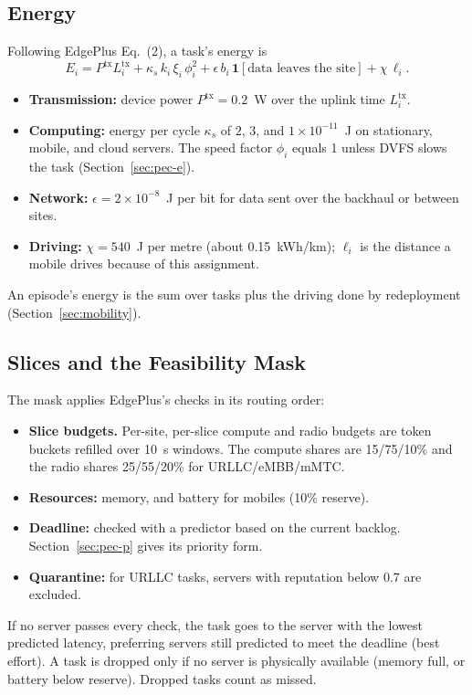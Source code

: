 \documentclass[11pt,journal,onecolumn]{IEEEtran}
\begin{document}
\subsection{Energy}
Following EdgePlus Eq.~(2), a task's energy is
\begin{equation}
E_i = P^{\mathrm{tx}} L^{\mathrm{tx}}_i + \kappa_s\, k_i\, \xi_i\, \phi_i^{2} + \epsilon\, b_i\, \mathbf{1}[\text{data leaves the site}] + \chi\, \ell_i .
\label{eq:energy}
\end{equation}
\begin{itemize}
\item \textbf{Transmission:} device power $P^{\mathrm{tx}}=0.2$~W over the uplink time $L^{\mathrm{tx}}_i$.
\item \textbf{Computing:} energy per cycle $\kappa_s$ of $2$, $3$, and $1\times10^{-11}$~J on stationary, mobile, and cloud servers. The speed factor $\phi_i$ equals 1 unless DVFS slows the task (Section~\ref{sec:pec-e}).
\item \textbf{Network:} $\epsilon = 2\times10^{-8}$~J per bit for data sent over the backhaul or between sites.
\item \textbf{Driving:} $\chi = 540$~J per metre (about 0.15~kWh/km); $\ell_i$ is the distance a mobile drives because of this assignment.
\end{itemize}
An episode's energy is the sum over tasks plus the driving done by redeployment (Section~\ref{sec:mobility}).

\subsection{Slices and the Feasibility Mask}
The mask applies EdgePlus's checks in its routing order:
\begin{itemize}
\item \textbf{Slice budgets.} Per-site, per-slice compute and radio budgets are token buckets refilled over 10~s windows. The compute shares are 15/75/10\% and the radio shares 25/55/20\% for URLLC/eMBB/mMTC.
\item \textbf{Resources:} memory, and battery for mobiles (10\% reserve).
\item \textbf{Deadline:} checked with a predictor based on the current backlog. Section~\ref{sec:pec-p} gives its priority form.
\item \textbf{Quarantine:} for URLLC tasks, servers with reputation below 0.7 are excluded.
\end{itemize}
If no server passes every check, the task goes to the server with the lowest predicted latency, preferring servers still predicted to meet the deadline (best effort). A task is dropped only if no server is physically available (memory full, or battery below reserve). Dropped tasks count as missed.
\end{document}
